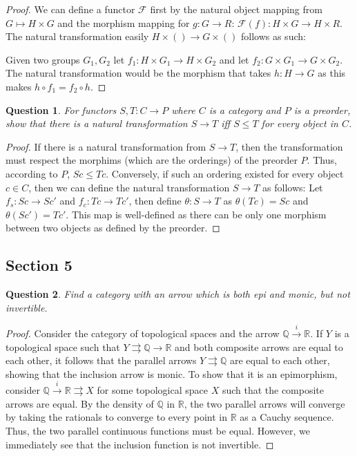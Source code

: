 \documentclass[12pt]{article}
\newtheorem{question}{Question}[section]
\theoremstyle{remark}
\begin{document}
\begin{proof}
 We can define a functor $\mathcal{F}$ first by the natural object mapping from $G \mapsto H \times G$ and the morphism mapping for $g: G \rightarrow R$: $\mathcal{F}(f): H \times G \rightarrow H \times R$. The natural transformation easily $H \times () \rightarrow G \times ()$ follows as such:
 
 Given two groups $G_1,G_2$ let $f_1: H \times G_1 \rightarrow H \times G_2$ and let $f_2: G \times G_1 \rightarrow G \times G_2$. The natural transformation would be the morphism that takes $h: H \rightarrow G$ as this makes $ h \circ f_1=f_2 \circ h$.\end{proof}

\begin{question}
 For functors $S,T: C \rightarrow P$ where $C$ is a category and $P$ is a preorder, show that there is a natural transformation $S \rightarrow T$ iff $S \leq T$ for every object in $C$.
\end{question}

\begin{proof}
 If there is a natural transformation from $S \rightarrow T$, then the transformation must respect the morphims (which are the orderings) of the preorder $P$. Thus, according to $P$, $Sc \leq Tc$. Conversely, if such an ordering existed for every object $c \in C$, then we can define the natural transformation $S \rightarrow T$ as follows: Let $f_s: Sc \rightarrow Sc'$ and $f_c:Tc \rightarrow Tc'$, then define $\theta: S\rightarrow T$ as $\theta(Tc) = Sc$ and $\theta(Sc') = Tc'$. This map is well-defined as there can be only one morphism between two objects as defined by the preorder.
\end{proof}

\subsection{Section 5}

\begin{question}
 Find a category with an arrow which is both epi and monic, but not invertible.
\end{question}

\begin{proof}
 Consider the category of topological spaces and the arrow $\mathbb{Q} \xrightarrow{i} \mathbb{R}$. If $Y$ is a topological space such that 
 $Y \rightrightarrows \mathbb{Q}\rightarrow \mathbb{R}$ and both composite arrows are equal to each other, it follows that the parallel arrows $Y \rightrightarrows \mathbb{Q}$ are equal to each other, showing that the inclusion arrow is monic. To show that it is an epimorphism, consider $\mathbb{Q} \xrightarrow{i} \mathbb{R} \rightrightarrows X$ for some topological space $X$ such that the composite arrows are equal. By the density of $\mathbb{Q}$ in $\mathbb{R}$, the two parallel arrows will converge by taking the rationals to converge to every point in $\mathbb{R}$ as a Cauchy sequence. Thus, the two parallel continuous functions must be equal. However, we immediately see that the inclusion function is not invertible.
\end{proof}
\end{document}

